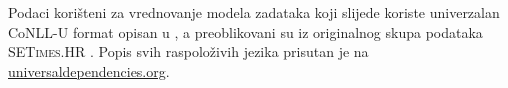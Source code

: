 Podaci korišteni za vrednovanje modela zadataka koji slijede koriste univerzalan
CoNLL-U format opisan u \citep{univdeps12}, a preoblikovani su iz originalnog skupa
podataka \textsc{SETimes.HR} \citep{agic2014setimes}. Popis svih raspoloživih
jezika prisutan je na
\href{http://universaldependencies.org/}{universaldependencies.org}.
